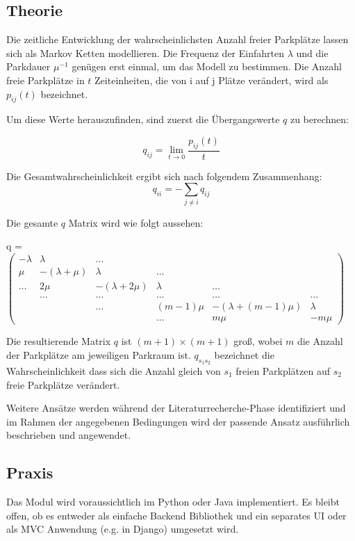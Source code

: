 \documentclass{article}
\begin{document}
\subsection{Theorie}
Die zeitliche Entwicklung der wahrscheinlichsten Anzahl freier Parkpl\"atze lassen sich als Markov Ketten modellieren\cite{Caliskan2007}. Die Frequenz der Einfahrten $\lambda$ und die Parkdauer $\mu^{-1}$ gen\"ugen erst einmal, um das Modell zu bestimmen. Die Anzahl freie Parkpl\"atze in $t$ Zeiteinheiten, die von i auf j Pl\"atze ver\"andert, wird als $p_{ij}(t)$ bezeichnet.

\vspace{2mm}
Um diese Werte herauszufinden, sind zuerst die \"Ubergangswerte $q$ zu berechnen:

$$q_{ij} = \lim_{t\to0} \frac{p_{ij}(t)}{t}$$

\vspace{2mm}
Die Gesamtwahrscheinlichkeit ergibt sich nach folgendem Zusammenhang:
$$q_{ii} = - \sum_{j\neq i} q_{ij}$$

\vspace{2mm}
Die gesamte $q$ Matrix wird wie folgt aussehen:

\vspace{2mm}
q = 
$
\begin{pmatrix}
-\lambda & \lambda & \dots &  &  &  \\
\mu & -(\lambda + \mu) & \lambda & \dots &  &  \\
\dots & 2\mu & -(\lambda + 2\mu) & \lambda & \dots & \\
 & \dots & \dots & \dots & \dots & \dots \\
 &  & \dots & (m-1)\mu & -(\lambda + (m-1)\mu) & \lambda \\
 &  &  & \dots & m\mu & -m\mu
\end{pmatrix}
$

\vspace{6mm}
Die resultierende Matrix $q$ ist $(m+1) \times (m+1)$ gro\ss{}, wobei $m$ die Anzahl der Parkpl\"atze am jeweiligen Parkraum ist. $q_{s_1s_2}$ bezeichnet die Wahrscheinlichkeit dass sich die Anzahl gleich von $s_1$ freien Parkpl\"atzen auf $s_2$ freie Parkpl\"atze ver\"andert.

Weitere Ans\"atze werden w\"ahrend der Literaturrecherche-Phase identifiziert und im Rahmen der angegebenen Bedingungen wird der passende Ansatz ausf\"uhrlich beschrieben und angewendet.

\subsection{Praxis}
Das Modul wird voraussichtlich im Python oder Java implementiert. Es bleibt offen, ob es entweder als einfache Backend Bibliothek und ein separates UI oder als MVC Anwendung (e.g. in Django) umgesetzt wird.
\end{document}
